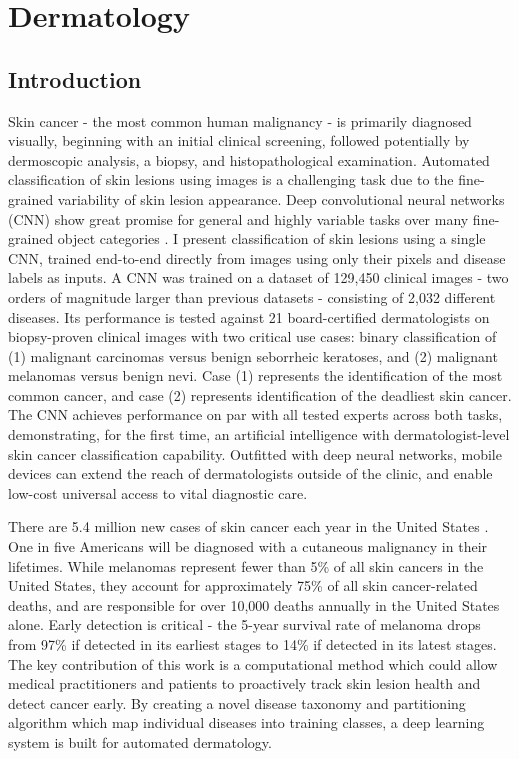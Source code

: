 \chapter{Dermatology}

\section{Introduction}
Skin cancer - the most common human malignancy \cite{society2016cancer, rogers2015incidence, stern2010prevalence} - is primarily diagnosed visually, beginning with an initial clinical screening, followed potentially by dermoscopic analysis, a biopsy, and histopathological examination. Automated classification of skin lesions using images is a challenging task due to the fine-grained variability of skin lesion appearance. Deep convolutional neural networks (CNN) \cite{lecun2015deep, lecun1998handbook} show great promise for general and highly variable tasks over many fine-grained object categories \cite{russakovsky2015imagenet, krizhevsky2012imagenet, ioffe2015batch,  szegedy2016rethinking, szegedy2015going, he2016deep}. I present classification of skin lesions using a single CNN, trained end-to-end directly from images using only their pixels and disease labels as inputs. A CNN was trained on a dataset of 129,450 clinical images - two orders of magnitude larger than previous datasets \cite{masood2013computer} - consisting of 2,032 different diseases. Its performance is tested against 21 board-certified dermatologists on biopsy-proven clinical images with two critical use cases: binary classification of (1) malignant carcinomas versus benign seborrheic keratoses, and (2) malignant melanomas versus benign nevi. Case (1) represents the identification of the most common cancer, and case (2) represents identification of the deadliest skin cancer. The CNN achieves performance on par with all tested experts across both tasks, demonstrating, for the first time, an artificial intelligence with dermatologist-level skin cancer classification capability. Outfitted with deep neural networks, mobile devices can extend the reach of dermatologists outside of the clinic, and enable low-cost universal access to vital diagnostic care. 

There are 5.4 million new cases of skin cancer each year in the United States \cite{rogers2015incidence}. One in five Americans will be diagnosed with a cutaneous malignancy in their lifetimes. While melanomas represent fewer than 5\% of all skin cancers in the United States, they account for approximately 75\% of all skin cancer-related deaths, and are responsible for over 10,000 deaths annually in the United States alone. Early detection is critical - the 5-year survival rate of melanoma drops from 97\% if detected in its earliest stages to 14\% if detected in its latest stages. The key contribution of this work is a computational method which could allow medical practitioners and patients to proactively track skin lesion health and detect cancer early. By creating a novel disease taxonomy and partitioning algorithm which map individual diseases into training classes, a deep learning system is built for automated dermatology. 

